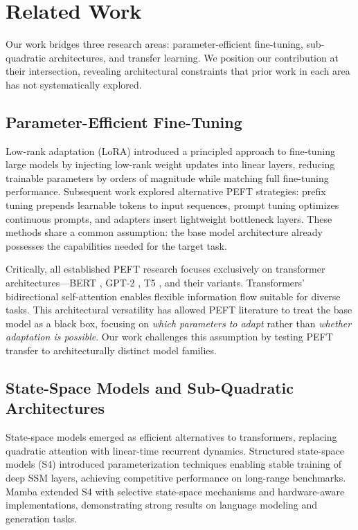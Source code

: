 \section{Related Work}

Our work bridges three research areas: parameter-efficient fine-tuning, sub-quadratic architectures, and transfer learning. We position our contribution at their intersection, revealing architectural constraints that prior work in each area has not systematically explored.

\subsection{Parameter-Efficient Fine-Tuning}

Low-rank adaptation (LoRA) \cite{hu2021lora} introduced a principled approach to fine-tuning large models by injecting low-rank weight updates into linear layers, reducing trainable parameters by orders of magnitude while matching full fine-tuning performance. Subsequent work explored alternative PEFT strategies: prefix tuning \cite{li2021prefix} prepends learnable tokens to input sequences, prompt tuning \cite{lester2021power} optimizes continuous prompts, and adapters \cite{houlsby2019parameter} insert lightweight bottleneck layers. These methods share a common assumption: the base model architecture already possesses the capabilities needed for the target task.

Critically, all established PEFT research focuses exclusively on transformer architectures---BERT \cite{devlin2019bert}, GPT-2 \cite{radford2019language}, T5 \cite{raffel2020exploring}, and their variants. Transformers' bidirectional self-attention enables flexible information flow suitable for diverse tasks. This architectural versatility has allowed PEFT literature to treat the base model as a black box, focusing on \textit{which parameters to adapt} rather than \textit{whether adaptation is possible}. Our work challenges this assumption by testing PEFT transfer to architecturally distinct model families.

\subsection{State-Space Models and Sub-Quadratic Architectures}

State-space models emerged as efficient alternatives to transformers, replacing quadratic attention with linear-time recurrent dynamics. Structured state-space models (S4) \cite{gu2022efficiently} introduced parameterization techniques enabling stable training of deep SSM layers, achieving competitive performance on long-range benchmarks. Mamba \cite{gu2023mamba} extended S4 with selective state-space mechanisms and hardware-aware implementations, demonstrating strong results on language modeling and generation tasks.

